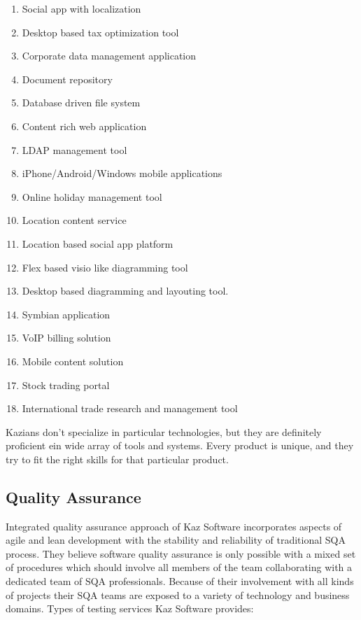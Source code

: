 \begin{enumerate}
    \item Social app with localization
    \item Desktop based tax optimization tool
    \item Corporate data management application
    \item Document repository
    \item Database driven file system
    \item Content rich web application
    \item LDAP management tool
    \item iPhone/Android/Windows mobile applications
    \item Online holiday management tool
    \item Location content service
    \item Location based social app platform
    \item Flex based visio like diagramming tool
    \item Desktop based diagramming and layouting tool.
    \item Symbian application
    \item VoIP billing solution
    \item Mobile content solution
    \item Stock trading portal
    \item International trade research and management tool
\end{enumerate}

Kazians don't specialize in particular technologies, but they are definitely proficient ein wide array of tools and systems.
Every product is unique, and they try to fit the right skills for that particular product.

\subsection{Quality Assurance}

Integrated quality assurance approach of Kaz Software incorporates aspects of agile and lean development with the stability and reliability of traditional SQA process.
They believe software quality assurance is only possible with a mixed set of procedures which should involve all members of the team collaborating with a dedicated team of SQA professionals.
Because of their involvement with all kinds of projects their SQA teams are exposed to a variety of technology and business domains.
Types of testing services Kaz Software provides:

